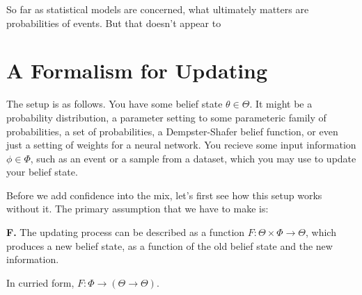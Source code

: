 \documentclass{article}
\begin{document}
    So far as statistical models are concerned, what ultimately matters are probabilities of events.
    But that doesn't appear to


\section{A Formalism for Updating}
\def\X{\mathcal X}
\def\W{\mathcal W}

The setup is as follows.
You have some belief state $\theta \in \Theta$. 
It might be 
a probability distribution, a parameter setting to some parameteric family of probabilities, a set of probabilities, a Dempster-Shafer belief function, or even just a setting of weights for a neural network. 
You recieve some input information $\phi \in \Phi$, such as an event or a sample from a dataset, which you may use to update your belief state. 

Before we add confidence into the mix, let's first see how this setup works without it.
The primary assumption that we have to make is:
\begin{CFaxioms}
    \item[\textbf{F.}] 
        The updating process can be described as a function $F : \Theta \times \Phi \to \Theta$, which produces a new belief state, as a function of the old belief state and the new information.
\end{CFaxioms}
In curried form, $F : \Phi \to (\Theta \to \Theta)$. 
\end{document}
